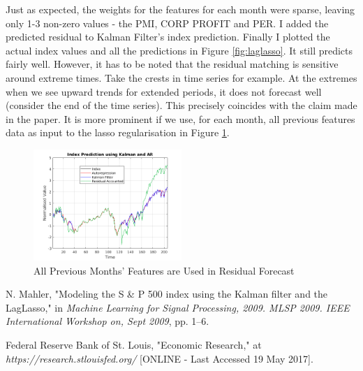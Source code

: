 \documentclass[11pt, fleqn]{article}
\begin{document}
Just as expected, the weights for the features for each month were sparse, leaving only 1-3 non-zero values - the PMI, CORP PROFIT and PER. I added the predicted residual to Kalman Filter's index prediction. Finally I plotted the actual index values and all the predictions in Figure \ref{fig:laglasso}. It still predicts fairly well. However, it has to be noted that the residual matching is sensitive around extreme times. Take the crests in time series for example. At the extremes when we see upward trends for extended periods, it does not forecast well (consider the end of the time series). This precisely coincides with the claim made in the paper. It is more prominent if we use, for each month, all previous features data as input to the lasso regularisation in Figure \ref{fig:laglasso-all}.

\begin{figure}[!h]
    \centering
    \includegraphics[width=0.5\textwidth]{laglasso_all.png}
	\caption{All Previous Months' Features are Used in Residual Forecast}
	\label{fig:laglasso-all}
\end{figure}

\begin{thebibliography}{9}
N. Mahler, "Modeling the S \& P 500 index using the Kalman filter and the LagLasso," in \textit{Machine Learning for Signal Processing, 2009. MLSP 2009. IEEE International Workshop on, Sept 2009}, pp. 1–6.

Federal Reserve Bank of St. Louis, "Economic Research," at \textit{https://research.stlouisfed.org/} [ONLINE - Last Accessed 19 May 2017].

\end{thebibliography}
\end{document}

